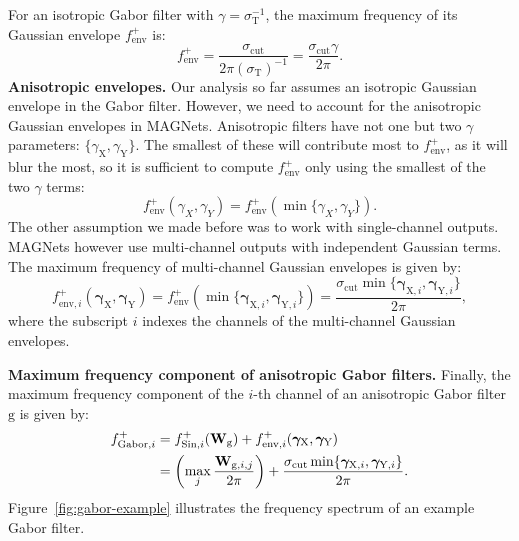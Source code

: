 \documentclass{article} \usepackage{iclr2022_conference,times}
\newcommand{\mat}[1]{\ensuremath{{\mathbf{\MakeUppercase{{#1}}}}}}
\newcommand{\Wm}{\mat{W}}
\def\Xt{\mathrm{X}}
\def\Yt{\mathrm{Y}}
\begin{document}
For an isotropic Gabor filter with $\gamma {=} \sigma_\mathrm{T}^{-1}$, the maximum frequency of its Gaussian envelope $f^{+}_{\mathrm{env}}$ is:
\begin{equation}
    f^+_{\mathrm{env}} = \frac{\sigma_\mathrm{cut}}{2 \pi (\sigma_\mathrm{T})^{-1}} = \frac{\sigma_{\mathrm{cut}} \gamma}{2 \pi}.
\end{equation}
\textbf{Anisotropic envelopes.} Our analysis so far assumes an isotropic Gaussian envelope in the Gabor filter. However, we need to account for the anisotropic Gaussian envelopes in MAGNets. Anisotropic filters have not one but two $\gamma$ parameters: $\{ \gamma_{\Xt}, \gamma_{\Yt}\}$. The smallest of these will contribute most to $f^+_{\mathrm{env}}$, as it will blur the most, so it is sufficient to compute $f^+_{\mathrm{env}}$ only using the smallest of the two $\gamma$ terms:
\begin{equation}
    f^+_{\mathrm{env}}(\gamma_X, \gamma_Y) = f^+_{\mathrm{env}}(\min\{\gamma_X, \gamma_Y\}).
\end{equation}
The other assumption we made before was to work with single-channel outputs. MAGNets however use multi-channel outputs with independent Gaussian terms. The maximum frequency of multi-channel Gaussian envelopes is given by:
\begin{equation}
    f^+_{\mathrm{env}, i}(\boldsymbol{\gamma}_{\Xt}, \boldsymbol{\gamma}_{\Yt}) = f^+_{\mathrm{env}}\left(\min\{\boldsymbol{\gamma}_{\Xt, i}, \boldsymbol{\gamma}_{\Yt,i}\}\right) = \frac{\sigma_\mathrm{cut} \min\{\boldsymbol{\gamma}_{\Xt, i}, \boldsymbol{\gamma}_{\Yt,i}\}}{2 \pi}, \label{eq:freqgaussian}
\end{equation}
where the subscript $i$ indexes the channels of the multi-channel Gaussian envelopes.


\textbf{Maximum frequency component of anisotropic Gabor filters.} Finally, the maximum frequency component of the $i$-th channel of an anisotropic Gabor filter $\boldsymbol{\mathrm{g}}$ is given by:
\begin{align}
    f^+_{\mathrm{Gabor}, i} &= f^+_{\mathrm{Sin}, i}(\Wm_\mathrm{g}) + f^+_{\mathrm{env}, i}(\boldsymbol{\gamma}_{\Xt}, \boldsymbol{\gamma}_{\Yt}) \nonumber \\
    &= \left( \max_{j} \frac{\Wm_{\mathrm{g}, i,j}}{2 \pi} \right) + \frac{\sigma_\mathrm{cut} \min\{\boldsymbol{\gamma}_{\Xt, i}, \boldsymbol{\gamma}_{\Yt,i}\}}{2 \pi}.
\end{align}
Figure~\ref{fig:gabor-example} illustrates the frequency spectrum of an example Gabor filter.
\end{document}

